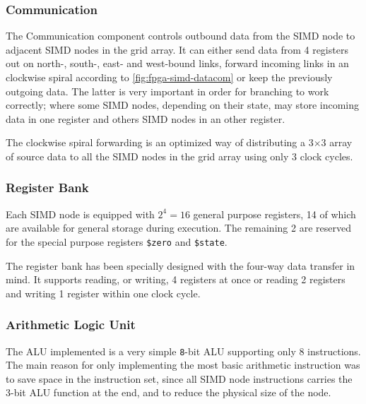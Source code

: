 \subsubsection{Communication}
The Communication component controls outbound data from the \ac{SIMD} node to
adjacent \ac{SIMD} nodes in the grid array. It can either send data from 4
registers out on north-, south-, east- and west-bound links, forward incoming
links in an clockwise spiral according to \ref{fig:fpga-simd-datacom} or keep
the previously outgoing data. The latter is very important in order for
branching to work correctly; where some \ac{SIMD} nodes, depending on their
state, may store incoming data in one register and others \ac{SIMD} nodes in an
other register.

The clockwise spiral forwarding is an optimized way of distributing a 3$\times$3 array
of source data to all the \ac{SIMD} nodes in the grid array using only 3 clock
cycles. 

\subsubsection{Register Bank}
Each \ac{SIMD} node is equipped with $2^4 = 16$ general purpose registers, 14 of
which are available for general storage during execution. The remaining 2 are
reserved for the special purpose registers {\tt \$zero} and {\tt \$state}.



The register bank has been specially designed with the four-way data transfer in
mind. It supports reading, or writing, 4 registers at once or reading 2
registers and writing 1 register within one clock cycle.

\subsubsection{Arithmetic Logic Unit}


The \ac{ALU} implemented is a very simple {\tt 8}-bit \ac{ALU} supporting only 8
instructions. The main reason for only implementing the most basic arithmetic
instruction was to save space in the instruction set, since all \ac{SIMD} node
instructions carries the 3-bit \ac{ALU} function at the end, and to reduce the
physical size of the node.

